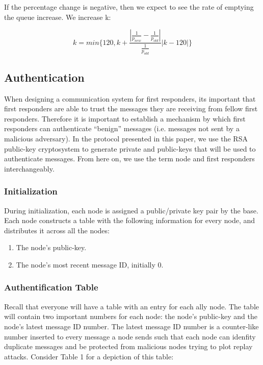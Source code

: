 \documentclass[letterpaper]{article}
\begin{document}
\noindent If the percentage change is negative, then we expect to see the rate of emptying the queue increase. We increase k:

$$ k = min\{120, k +  \frac{|\frac{1}{p_{new}} - \frac{1}{p_{old}}|}{\frac{1}{p_{old}}}|k - 120|   \}$$ 

\subsection{Authentication}
When designing a communication system for first responders, its important that first responders are able to trust the messages they are receiving from fellow first responders. Therefore it is important to establish a mechanism by which first responders can authenticate “benign” messages (i.e. messages not sent by a malicious adversary). In the protocol presented in this paper, we use the RSA public-key cryptosystem to generate private and public-keys that will be used to authenticate messages. From here on, we use the term node and first responders interchangeably.

\subsubsection{Initialization}
During initialization, each node is assigned a public/private key pair by the base. Each node constructs a table with the following information for every node, and distributes it across all the nodes:

\begin{enumerate}
  \item The node's public-key. 
  \item The node's most recent message ID, initially 0.
\end{enumerate}

\subsubsection{Authentification Table}
Recall that everyone will have a table with an entry for each ally node. The table will contain two important numbers for each node: the node's public-key and the node's latest message ID number. The latest message ID number is a counter-like number inserted to every message a node sends such that each node can idenfity duplicate messages and be protected from malicious nodes trying to plot replay attacks. Consider Table 1 for a depiction of this table:
\end{document}
